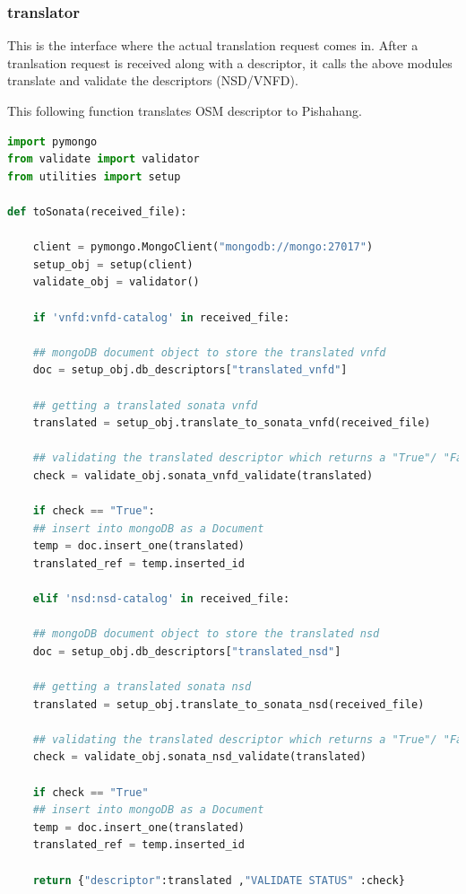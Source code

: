 \subsubsection{translator}

This is the interface where the actual translation request comes in. After a tranlsation request is received along with a descriptor, it calls the above modules translate and validate the descriptors (NSD/VNFD).

This following function translates OSM descriptor to Pishahang.
\begin{lstlisting}[language=Python]
import pymongo
from validate import validator
from utilities import setup

def toSonata(received_file):

	client = pymongo.MongoClient("mongodb://mongo:27017")
	setup_obj = setup(client)
	validate_obj = validator()
	
	if 'vnfd:vnfd-catalog' in received_file:
	
	## mongoDB document object to store the translated vnfd
	doc = setup_obj.db_descriptors["translated_vnfd"]
	
	## getting a translated sonata vnfd
	translated = setup_obj.translate_to_sonata_vnfd(received_file)
	
	## validating the translated descriptor which returns a "True"/ "False" string
	check = validate_obj.sonata_vnfd_validate(translated)
	
	if check == "True":
	## insert into mongoDB as a Document
	temp = doc.insert_one(translated)
	translated_ref = temp.inserted_id
	
	elif 'nsd:nsd-catalog' in received_file:
	
	## mongoDB document object to store the translated nsd
	doc = setup_obj.db_descriptors["translated_nsd"]
	
	## getting a translated sonata nsd
	translated = setup_obj.translate_to_sonata_nsd(received_file)
	
	## validating the translated descriptor which returns a "True"/ "False" string
	check = validate_obj.sonata_nsd_validate(translated)
	
	if check == "True"
	## insert into mongoDB as a Document
	temp = doc.insert_one(translated)
	translated_ref = temp.inserted_id
	
	return {"descriptor":translated ,"VALIDATE STATUS" :check}
\end{lstlisting}

\pagebreak

